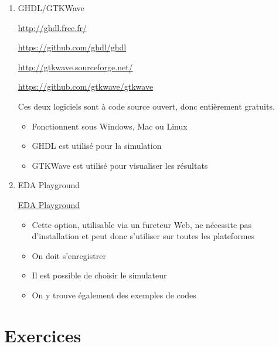 \documentclass[letter, oneside]{book}
\begin{document}
\begin{enumerate}
\item GHDL/GTKWave
\label{sec:org994e334}

\url{http://ghdl.free.fr/}

\url{https://github.com/ghdl/ghdl}

\url{http://gtkwave.sourceforge.net/}

\url{https://github.com/gtkwave/gtkwave}

Ces deux logiciels sont à code source ouvert, donc entièrement
gratuits.

\begin{itemize}
\item Fonctionnent sous Windows, Mac ou Linux
\item GHDL est utilisé pour la simulation
\item GTKWave est utilisé pour visualiser les résultats
\end{itemize}

\item EDA Playground
\label{sec:org61eff8e}

\href{https://www.edaplayground.com/}{EDA Playground}

\begin{itemize}
\item Cette option, utilisable via un fureteur Web, ne nécessite pas
d'installation et peut donc s'utiliser sur toutes les plateformes
\item On doit s'enregistrer
\item Il est possible de choisir le simulateur
\item On y trouve également des exemples de codes
\end{itemize}
\end{enumerate}

\chapter{Exercices}
\label{sec:org1726fd7}
\end{document}
